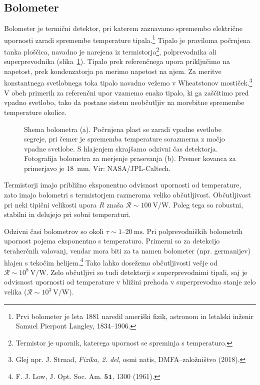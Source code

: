 \subsection*{Bolometer}
Bolometer je termični detektor, pri katerem zaznavamo spremembo 
električne upornosti
zaradi spremembe temperature tipala.\footnote{Prvi bolometer je leta 1881 naredil
ameriški fizik, astronom in letalski inženir Samuel Pierpont Langley, 1834--1906.}
Tipalo je praviloma počrnjena tanka ploščica, 
navadno je narejena iz termistorja\footnote{Termistor je upornik, katerega
upornost se spreminja s temperaturo.},  polprevodnika ali superprevodnika 
(slika~\ref{fig:Bolometer-shema}). Tipalo prek
referenčnega upora priključimo na napetost, prek kondenzatorja pa merimo napetost na njem.
Za meritve konstantnega svetlobnega toka tipalo navadno vežemo v Wheatstonov mostiček.\footnote{Glej
npr. J. Strnad, {\it Fizika, 2. del}, osmi natis, DMFA--založništvo (2018).} V obeh
primerih za referenčni upor vzamemo enako tipalo, ki ga zaščitimo pred vpadno svetlobo, 
tako da postane sistem neobčutljiv na morebitne spremembe temperature okolice.
\begin{figure}[h!]
\centering
\def\svgwidth{140truemm} 

\caption{Shema bolometra (a). Počrnjena plast se zaradi vpadne svetlobe segreje, pri čemer
je sprememba temperature sorazmerna z močjo vpadne svetlobe. S hlajenjem skrajšamo odzivni čas
detektorja. Fotografija bolometra za merjenje prasevanja (b). 
Premer kovanca za primerjavo je 18~mm. 
Vir: NASA/JPL-Caltech.}
\label{fig:Bolometer-shema}
\end{figure}

Termistorji imajo približno eksponentno odvisnost upornosti od temperature, zato imajo bolometri
s termistorjem razmeroma veliko občutljivost. Občutljivost pri neki tipični
velikosti upora $R$ znaša $\mathcal{R}\sim 100~\si{\volt/\watt}$. Poleg tega so 
robustni, stabilni in delujejo pri sobni temperaturi. 

Odzivni časi bolometrov so okoli 
$\tau \sim 1$--$20~\si{\milli\second}$. 
Pri polprevodniških bolometrih upornost pojema eksponentno s temperaturo. 
Primerni so za detekcijo teraherčnih valovanj, 
vendar mora biti za ta namen bolometer (npr. germanijev) hlajen s tekočim helijem.\footnote{F. J. 
Low, J. Opt. Soc. Am. $\mathbf{51}$, 1300 (1961).}  
Tako lahko dosežemo občutljivosti večje od $\mathcal{R} \sim 10^8~\si{\volt/\watt}$. Zelo 
občutljivi so tudi detektorji s superprevodnimi tipali, saj je odvisnost upornosti 
od temperature v bližini prehoda v superprevodno stanje zelo velika 
($\mathcal{R} \sim 10^3~\si{\volt/\watt}$).

